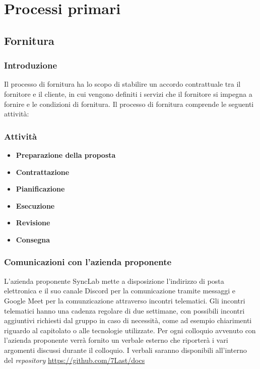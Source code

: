 \section{Processi primari}
\subsection{Fornitura}
\subsubsection{Introduzione}
Il processo di fornitura ha lo scopo di stabilire un accordo contrattuale tra il fornitore e il cliente, in cui vengono definiti i servizi che il fornitore si impegna a fornire e le condizioni di fornitura.
Il processo di fornitura comprende le seguenti attività:
\subsubsection{Attività}
\begin{itemize}
	\item \textbf{Preparazione della proposta}
	\item \textbf{Contrattazione}
	\item \textbf{Pianificazione}
	\item \textbf{Esecuzione}
	\item \textbf{Revisione}
	\item \textbf{Consegna}
\end{itemize}

\subsubsection{Comunicazioni con l'azienda proponente}
L'azienda proponente SyncLab mette a disposizione l'indirizzo di posta elettronica e il suo canale Discord per la comunicazione tramite messaggi e Google Meet per la comunzicazione attraverso incontri telematici.
Gli incontri telematici hanno una cadenza regolare di due settimane, con possibili incontri aggiuntivi richiesti dal gruppo in caso di necessità, come ad esempio chiarimenti riguardo al capitolato o alle tecnologie utilizzate.
Per ogni colloquio avvenuto con l'azienda proponente verrà fornito un verbale esterno che riporterà i vari argomenti discussi durante il colloquio.
I verbali saranno disponibili all'interno del \textit{repository} \url{https://github.com/7Last/docs}
